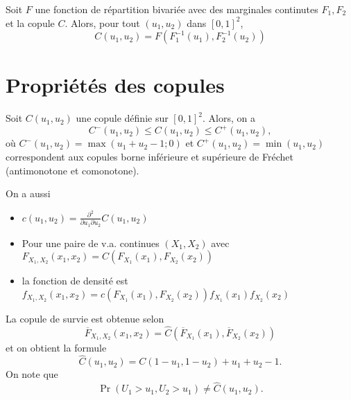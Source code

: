 \begin{corollaire}{}{}
	Soit $F$ une fonction de répartition bivariée avec des marginales continutes $F_1, F_2$ et la copule $C$. Alors, pour tout $(u_1, u_2)$ dans $[0, 1]^2$, 
	$$C(u_1, u_2) = F\left(F_1^{-1}(u_1), F_2^{-1}(u_2)\right)$$
\end{corollaire}

\section{Propriétés des copules}

\begin{definition}{}{}
	Soit $C(u_1, u_2)$ une copule définie sur $[0, 1]^2$. Alors, on a 
	$$C^-(u_1, u_2) \leq C(u_1, u_2) \leq C^+(u_1, u_2),$$
	où $C^-(u_1, u_2) = \max(u_1 + u_2 - 1; 0)$ et $C^+(u_1, u_2) = \min(u_1, u_2)$ correspondent aux copules borne inférieure et supérieure de Fréchet (antimonotone et comonotone). 
\end{definition}

On a aussi 
\begin{itemize}
	\item $\displaystyle c(u_1, u_2) = \frac{\partial^2}{\partial u_1 \partial u_2} C(u_1, u_2)$
	\item Pour une paire de v.a. continues $(X_1, X_2)$ avec 
	$ \displaystyle F_{X_1, X_2}(x_1, x_2) = C(F_{X_1}(x_1), F_{X_2}(x_2))$
	\item la fonction de densité est $\displaystyle f_{X_1, X_2}(x_1, x_2) = c(F_{X_1}(x_1), F_{X_2}(x_2))f_{X_1}(x_1)f_{X_2}(x_2)$
\end{itemize}

La copule de survie est obtenue selon 
$$\overline{F}_{X_1, X_2}(x_1, x_2) = \widehat{C}\left(\overline{F}_{X_1}(x_1), \overline{F}_{X_2}(x_2)\right)$$
et on obtient la formule 
$$\widehat{C}(u_1, u_2) = C(1 - u_1, 1 - u_2) + u_1 + u_2 - 1.$$
On note que 
$$\Pr(U_1>u_1, U_2>u_1) \neq \widehat{C}(u_1, u_2).$$

